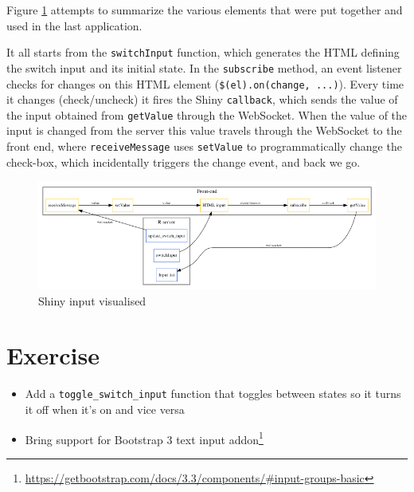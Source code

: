 \documentclass[10pt,]{krantz}
\providecommand{\tightlist}{%
  \setlength{\itemsep}{0pt}\setlength{\parskip}{0pt}}
\renewcommand{\href}[2]{#2\footnote{\url{#1}}}
\begin{document}
Figure \ref{fig:shiny-input-diagram} attempts to summarize the various elements that were put together and used in the last application.

It all starts from the \texttt{switchInput} function, which generates the HTML defining the switch input and its initial state. In the \texttt{subscribe} method, an event listener checks for changes on this HTML element (\texttt{\$(el).on(\textquotesingle{}change\textquotesingle{},\ ...)}). Every time it changes (check/uncheck) it fires the Shiny \texttt{callback}, which sends the value of the input obtained from \texttt{getValue} through the WebSocket. When the value of the input is changed from the server this value travels through the WebSocket to the front end, where \texttt{receiveMessage} uses \texttt{setValue} to programmatically change the check-box, which incidentally triggers the change event, and back we go.

\begin{figure}[H]

{\centering \includegraphics[width=1\linewidth]{images/04-shiny-input} 

}

\caption{Shiny input visualised}\label{fig:shiny-input-diagram}
\end{figure}

\hypertarget{shiny-input-excercise}{%
\section{Exercise}\label{shiny-input-excercise}}

\begin{itemize}
\tightlist
\item
  Add a \texttt{toggle\_switch\_input} function that toggles between states so it turns it off when it's on and vice versa
\item
  Bring support for \href{https://getbootstrap.com/docs/3.3/components/\#input-groups-basic}{Bootstrap 3 text input addon}
\end{itemize}
\end{document}
